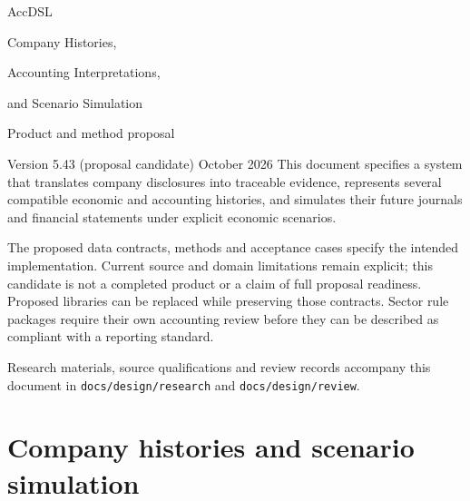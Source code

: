 \documentclass[11pt,a4paper]{report}
\newcommand{\code}[1]{\texttt{#1}}
\begin{document}
\hypersetup{pageanchor=false}
\begin{titlepage}
\vspace*{20mm}
{\sffamily\color{ink}\Huge AccDSL\par}
\vspace{7mm}
{\LARGE Company Histories,\par Accounting Interpretations,\par and Scenario Simulation\par}
\vspace{12mm}
{\Large Product and method proposal\par}
\vspace{5mm}
Version 5.43 (proposal candidate)  October 2026
\vfill
This document specifies a system that translates company disclosures into
traceable evidence, represents several compatible economic and accounting
histories, and simulates their future journals and financial statements under
explicit economic scenarios.

The proposed data contracts, methods and acceptance cases specify the intended
implementation. Current source and domain limitations remain explicit; this
candidate is not a completed product or a claim of full proposal readiness. Proposed libraries can be replaced while preserving those
contracts. Sector rule packages require their own accounting review before
they can be described as compliant with a reporting standard.

\vspace{8mm}
Research materials, source qualifications and review records accompany this
document in \code{docs/design/research} and \code{docs/design/review}.
\end{titlepage}
\hypersetup{pageanchor=true}
\tableofcontents
\clearpage{}
\part{Company histories and scenario simulation}


























\clearpage\label{sim:body-end}
\end{document}

